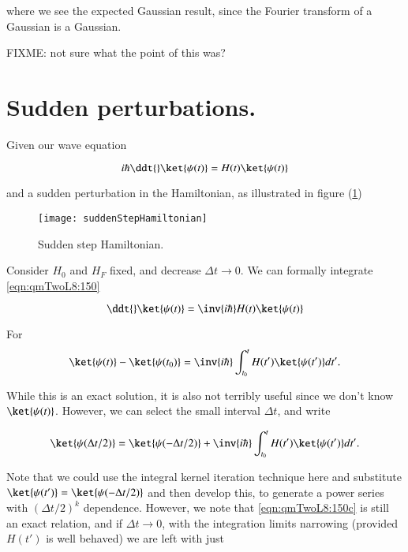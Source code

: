 where we see the expected Gaussian result, since the Fourier transform of a Gaussian is a Gaussian.

FIXME: not sure what the point of this was?

\section{Sudden perturbations.}

Given our wave equation

\begin{equation}\label{eqn:qmTwoL8:150}
i \hbar \ddt{} \ket{\psi(t)} = H(t) \ket{\psi(t)}
\end{equation}

and a sudden perturbation in the Hamiltonian, as illustrated in figure (\ref{fig:suddenStepHamiltonian})

\begin{figure}[htp]
\centering
\texttt{[image: suddenStepHamiltonian]}
\caption{Sudden step Hamiltonian.}\label{fig:suddenStepHamiltonian}
\end{figure}

Consider $H_0$ and $H_F$ fixed, and decrease $\Delta t \rightarrow 0$.  We can formally integrate \ref{eqn:qmTwoL8:150}

\begin{equation}\label{eqn:qmTwoL8:150b}
\ddt{} \ket{\psi(t)} = \inv{i \hbar} H(t) \ket{\psi(t)}
\end{equation}

For
\begin{equation}\label{eqn:qmTwoL8:150e}
\ket{\psi(t)} -\ket{\psi(t_0)}
 = \inv{i \hbar} \int_{t_0}^t H(t') \ket{\psi(t')} dt'.
\end{equation}

While this is an exact solution, it is also not terribly useful since we don't know $\ket{\psi(t)}$.  However, we can select the small interval $\Delta t$, and write

\begin{equation}\label{eqn:qmTwoL8:150c}
\ket{\psi(\Delta t/2)} =
\ket{\psi(-\Delta t/2)}
+ \inv{i \hbar} \int_{t_0}^t H(t') \ket{\psi(t')} dt'.
\end{equation}

Note that we could use the integral kernel iteration technique here and substitute $\ket{\psi(t')} = \ket{\psi(-\Delta t/2)}$ and then develop this, to generate a power series with $(\Delta t/2)^k$ dependence.  However, we note that \ref{eqn:qmTwoL8:150c} is still an exact relation, and if $\Delta t \rightarrow 0$, with the integration limits narrowing (provided $H(t')$ is well behaved) we are left with just

